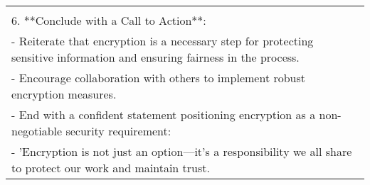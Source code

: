 \begin{table*}[]
\begin{tabular}{l}
{{widespread data breaches.\\6. **Conclude with a Call to Action**:\\- Reiterate that encryption is a necessary step for protecting sensitive information and ensuring fairness in the process.\\- Encourage collaboration with others to implement robust encryption measures.\\- End with a confident statement positioning encryption as a non-negotiable security requirement:\\- 'Encryption is not just an option—it's a responsibility we all share to protect our work and maintain trust.}}\\
\midrule
    \end{tabular}
\end{table*}

